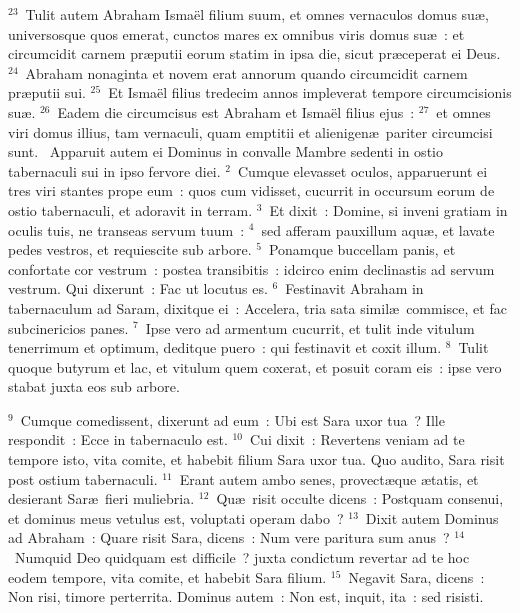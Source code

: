 ${}^{23}$~Tulit autem Abraham Isma\"el filium suum, et omnes vernaculos domus su\ae , universosque quos emerat, cunctos mares ex omnibus viris domus su\ae~: et circumcidit carnem pr\ae putii eorum statim in ipsa die, sicut pr\ae ceperat ei Deus.
${}^{24}$~Abraham nonaginta et novem erat annorum quando circumcidit carnem pr\ae putii sui.
${}^{25}$~Et Isma\"el filius tredecim annos impleverat tempore circumcisionis su\ae .
${}^{26}$~Eadem die circumcisus est Abraham et Isma\"el filius ejus~:
${}^{27}$~et omnes viri domus illius, tam vernaculi, quam emptitii et alienigen\ae\ pariter circumcisi sunt.
~Apparuit autem ei Dominus in convalle Mambre sedenti in ostio tabernaculi sui in ipso fervore diei.
${}^{2}$~Cumque elevasset oculos, apparuerunt ei tres viri stantes prope eum~: quos cum vidisset, cucurrit in occursum eorum de ostio tabernaculi, et adoravit in terram.
${}^{3}$~Et dixit~: Domine, si inveni gratiam in oculis tuis, ne transeas servum tuum~:
${}^{4}$~sed afferam pauxillum aqu\ae , et lavate pedes vestros, et requiescite sub arbore.
${}^{5}$~Ponamque buccellam panis, et confortate cor vestrum~: postea transibitis~: idcirco enim declinastis ad servum vestrum. Qui dixerunt~: Fac ut locutus es.
${}^{6}$~Festinavit Abraham in tabernaculum ad Saram, dixitque ei~: Accelera, tria sata simil\ae\ commisce, et fac subcinericios panes.
${}^{7}$~Ipse vero ad armentum cucurrit, et tulit inde vitulum tenerrimum et optimum, deditque puero~: qui festinavit et coxit illum.
${}^{8}$~Tulit quoque butyrum et lac, et vitulum quem coxerat, et posuit coram eis~: ipse vero stabat juxta eos sub arbore.


${}^{9}$~Cumque comedissent, dixerunt ad eum~: Ubi est Sara uxor tua~? Ille respondit~: Ecce in tabernaculo est.
${}^{10}$~Cui dixit~: Revertens veniam ad te tempore isto, vita comite, et habebit filium Sara uxor tua. Quo audito, Sara risit post ostium tabernaculi.
${}^{11}$~Erant autem ambo senes, provect\ae que \ae tatis, et desierant Sar\ae\ fieri muliebria.
${}^{12}$~Qu\ae\ risit occulte dicens~: Postquam consenui, et dominus meus vetulus est, voluptati operam dabo~?
${}^{13}$~Dixit autem Dominus ad Abraham~: Quare risit Sara, dicens~: Num vere paritura sum anus~?
${}^{14}$~Numquid Deo quidquam est difficile~? juxta condictum revertar ad te hoc eodem tempore, vita comite, et habebit Sara filium.
${}^{15}$~Negavit Sara, dicens~: Non risi, timore perterrita. Dominus autem~: Non est, inquit, ita~: sed risisti.



